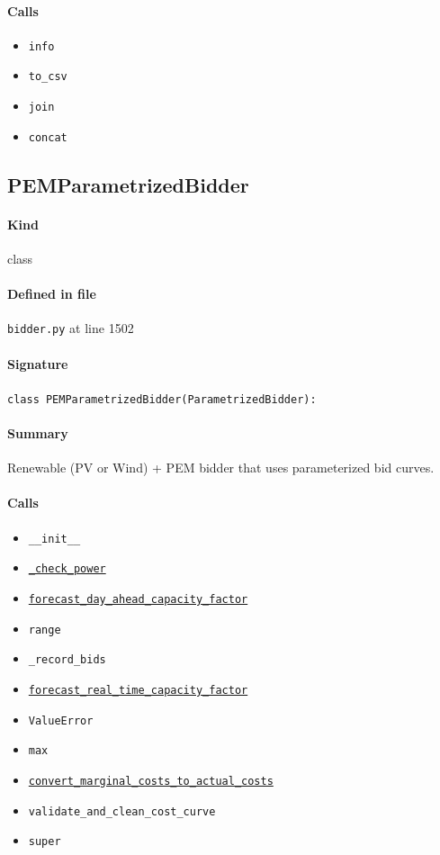 \documentclass[11pt]{report}
\begin{document}
\paragraph{Calls}
\begin{itemize}[leftmargin=*]
  \item \texttt{info}
  \item \texttt{to\_csv}
  \item \texttt{join}
  \item \texttt{concat}
\end{itemize}
\subsection{PEMParametrizedBidder}
\label{def:bidder.py:PEMParametrizedBidder:L1502}
\paragraph{Kind} class
\paragraph{Defined in file} \texttt{bidder.py} at line 1502
\paragraph{Signature} \texttt{class PEMParametrizedBidder(ParametrizedBidder):}
\paragraph{Summary} Renewable (PV or Wind) + PEM bidder that uses parameterized bid curves.
\paragraph{Calls}
\begin{itemize}[leftmargin=*]
  \item \texttt{\_\_init\_\_}
  \item \hyperref[def:bidder.py:PEMParametrizedBidder._check_power:L1555]{\texttt{\_check\_power}}
  \item \hyperref[def:forecaster.py:PerfectForecaster.forecast_day_ahead_capacity_factor:L790]{\texttt{forecast\_day\_ahead\_capacity\_factor}}
  \item \texttt{range}
  \item \texttt{\_record\_bids}
  \item \hyperref[def:forecaster.py:PerfectForecaster.forecast_real_time_capacity_factor:L793]{\texttt{forecast\_real\_time\_capacity\_factor}}
  \item \texttt{ValueError}
  \item \texttt{max}
  \item \hyperref[def:utils.py:convert_marginal_costs_to_actual_costs:L15]{\texttt{convert\_marginal\_costs\_to\_actual\_costs}}
  \item \texttt{validate\_and\_clean\_cost\_curve}
  \item \texttt{super}
\end{itemize}
\end{document}
